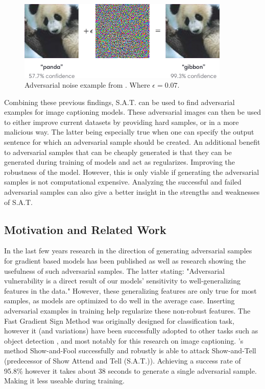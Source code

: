 \begin{figure}[h]
    \centering
    \includegraphics[width=0.9\textwidth]{figures/adversarial_img_1.png}
    \caption{Adversarial noise example from \protect\cite{goodfellow2015explaining}. Where $\epsilon=0.07$.}
    \label{adv_gibbon}
\end{figure}

Combining these previous findings, S.A.T. can be used to find adversarial examples for image captioning models. These adversarial images can then be used to either improve current datasets by providing hard samples, or in a more malicious way. The latter being especially true when one can specify the output sentence for which an adversarial sample should be created. An additional benefit to adversarial samples that can be cheaply generated is that they can be generated during training of models and act as regularizes. Improving the robustness of the model. However, this is only viable if generating the adversarial samples is not computational expensive.
Analyzing the successful and failed adversarial samples can also give a better insight in the strengths and weaknesses of S.A.T.

\subsection{Motivation and Related Work}
In the last few years research in the direction of generating adversarial samples for gradient based models has been published \cite{goodfellow2015explaining,Kurakin} as well as research showing the usefulness of such adversarial samples\cite{Ilyas2019features}. The latter stating: "Adversarial vulnerability is a direct result of our models' sensitivity to well-generalizing features in the data." However, these generalizing features are only true for most samples, as models are optimized to do well in the average case. Inserting adversarial examples in training help regularize these non-robust features\cite{https://doi.org/10.48550/arxiv.1611.01236}. The Fast Gradient Sign Method was originally designed for classification task, however it (and variations) have been successfully adopted to other tasks such as object detection \cite{AdversarialAttacksOnFace,AdversarialFasterRCNN,DBLP:journals/corr/abs-1907-10310}, and most notably for this research on image captioning\cite{Hongge}. \citeauthor{Hongge}'s method Show-and-Fool successfully and robustly is able to attack Show-and-Tell\cite{showandtell} (predecessor of Show Attend and Tell (S.A.T.)). Achieving a success rate of 95.8\% however it takes about 38 seconds to generate a single adversarial sample. Making it less useable during training.

